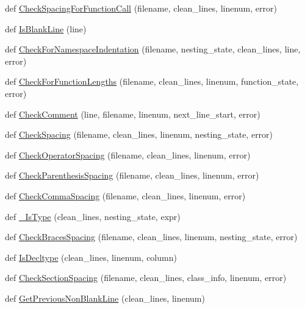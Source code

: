 \begin{DoxyCompactItemize}
\item 
def \hyperlink{namespacecpplint_a2ea8b2c917d5ce466287e1c6fe26f0db}{Check\+Spacing\+For\+Function\+Call} (filename, clean\+\_\+lines, linenum, error)
\item 
def \hyperlink{namespacecpplint_adf59429f3dd145e978624fe239809260}{Is\+Blank\+Line} (line)
\item 
def \hyperlink{namespacecpplint_a7c5964127d06521a2a05fbb28cc26478}{Check\+For\+Namespace\+Indentation} (filename, nesting\+\_\+state, clean\+\_\+lines, line, error)
\item 
def \hyperlink{namespacecpplint_a2699a7cad55a82cab5f73c012747203e}{Check\+For\+Function\+Lengths} (filename, clean\+\_\+lines, linenum, function\+\_\+state, error)
\item 
def \hyperlink{namespacecpplint_af126b85f4c25f359c40ce349f4eb7a2d}{Check\+Comment} (line, filename, linenum, next\+\_\+line\+\_\+start, error)
\item 
def \hyperlink{namespacecpplint_a73e82f51a8d59c816db26b5f797b3431}{Check\+Spacing} (filename, clean\+\_\+lines, linenum, nesting\+\_\+state, error)
\item 
def \hyperlink{namespacecpplint_a6a15b27f48cfd70fbf76f595c34f6d9e}{Check\+Operator\+Spacing} (filename, clean\+\_\+lines, linenum, error)
\item 
def \hyperlink{namespacecpplint_aacf5fa793ab27c7038e376d6a4c53d87}{Check\+Parenthesis\+Spacing} (filename, clean\+\_\+lines, linenum, error)
\item 
def \hyperlink{namespacecpplint_a46d2c48a2d4e747feee44616af987bdf}{Check\+Comma\+Spacing} (filename, clean\+\_\+lines, linenum, error)
\item 
def \hyperlink{namespacecpplint_a39f66286af1f183c73af6a8e45ba0a58}{\+\_\+\+Is\+Type} (clean\+\_\+lines, nesting\+\_\+state, expr)
\item 
def \hyperlink{namespacecpplint_a205bb76a59359eb1c0be86567bbc5256}{Check\+Braces\+Spacing} (filename, clean\+\_\+lines, linenum, nesting\+\_\+state, error)
\item 
def \hyperlink{namespacecpplint_a6e55ab13af2fa8b8e1f50e09aed592b8}{Is\+Decltype} (clean\+\_\+lines, linenum, column)
\item 
def \hyperlink{namespacecpplint_abc4e2f3f48debd6ae3a9561d052a955b}{Check\+Section\+Spacing} (filename, clean\+\_\+lines, class\+\_\+info, linenum, error)
\item 
def \hyperlink{namespacecpplint_a27743480b080a71eb8a0320da2ca0fa3}{Get\+Previous\+Non\+Blank\+Line} (clean\+\_\+lines, linenum)

\end{DoxyCompactItemize}
